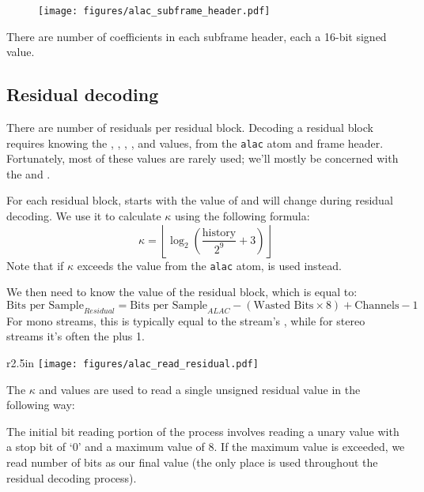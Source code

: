 \begin{figure}[h]
\texttt{[image: figures/alac\_subframe\_header.pdf]}
\end{figure}
\par
\noindent
There are  number of coefficients in each
subframe header, each a 16-bit signed value.

\pagebreak

\subsection{Residual decoding}

There are  number of residuals per residual block.
Decoding a residual block requires knowing the ,
, , ,  and
 values, from the \texttt{alac} atom and frame header.
Fortunately, most of these values are rarely used;
we'll mostly be concerned with the  and .

For each residual block,  starts with the value of
 and will change during residual decoding.
We use it to calculate $\kappa$ using the following formula:
\begin{equation}
\kappa = \left\lfloor\log_2 \left( \frac{\text{history}}{2 ^ 9} + 3 \right) \right\rfloor
\end{equation}
Note that if $\kappa$ exceeds the  value from the
\texttt{alac} atom,  is used instead.

We then need to know the  value of the residual
block, which is equal to:
\begin{equation}
\text{Bits per Sample}_{Residual} = \text{Bits per Sample}_{ALAC} - (\text{Wasted Bits} \times 8) + \text{Channels} - 1
\end{equation}
For mono streams, this is typically equal to the stream's
,
while for stereo streams it's often the  plus 1.

\begin{wrapfigure}[14]{r}{2.5in}
\texttt{[image: figures/alac\_read\_residual.pdf]}
\end{wrapfigure}
The $\kappa$ and  values are used to read a
single unsigned residual value in the following way:

The initial bit reading portion of the process
involves reading a unary value with a stop bit of `0'
and a maximum value of 8.
If the maximum value is exceeded, we read 
number of bits as our final value
(the only place  is used throughout the
residual decoding process).

